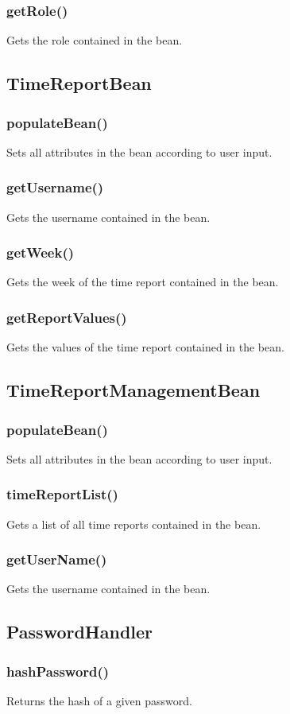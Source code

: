\documentclass{article}
\begin{document}
\subsubsection{getRole()}
Gets the role contained in the bean.
\subsection{TimeReportBean}
\subsubsection{populateBean()}
Sets all attributes in the bean according to user input.
\subsubsection{getUsername()}
Gets the username contained in the bean.
\subsubsection{getWeek()}
Gets the week of the time report contained in the bean.
\subsubsection{getReportValues()}
Gets the values of the time report contained in the bean.

\subsection{TimeReportManagementBean}
\subsubsection{populateBean()}
Sets all attributes in the bean according to user input.
\subsubsection{timeReportList()}
Gets a list of all time reports contained in the bean.
\subsubsection{getUserName()}
Gets the username contained in the bean.

\subsection{PasswordHandler}
\subsubsection{hashPassword()}
Returns the hash of a given password.
\end{document}
